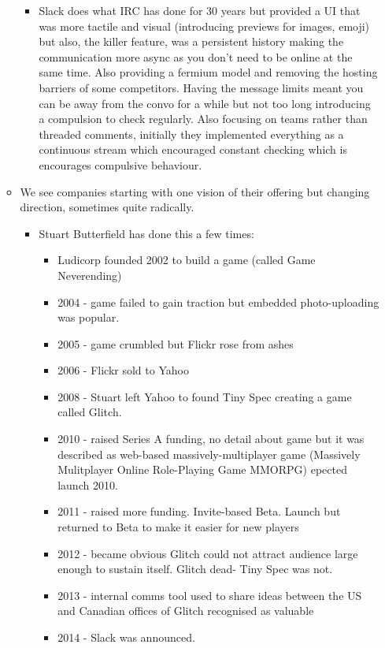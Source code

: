 \documentclass[11pt]{article}
\begin{document}
\begin{itemize}
\begin{itemize}
\begin{itemize}
\item Slack does what IRC has done for 30 years but provided a UI that was more tactile and visual (introducing previews for images, emoji) but also, the killer feature, was a persistent history
making the communication more async as you don't need to be online at the same time. Also providing a fermium model and removing the hosting barriers of some competitors. Having the message
limits meant you can be away from the convo for a while but not too long introducing a compulsion to check regularly. Also focusing on teams rather than threaded comments, initially they
implemented everything as a continuous stream which encouraged constant checking which is encourages compulsive behaviour.
\end{itemize}
\item We see companies starting with one vision of their offering but changing direction, sometimes quite radically.
\begin{itemize}
\item Stuart Butterfield has done this a few times:
\begin{itemize}
\item Ludicorp founded 2002 to build a game (called Game Neverending)
\item 2004 - game failed to gain traction but embedded photo-uploading was popular.
\item 2005 - game crumbled but Flickr rose from ashes
\item 2006 - Flickr sold to Yahoo
\item 2008 - Stuart left Yahoo to found Tiny Spec creating a game called Glitch.
\item 2010 - raised Series A funding, no detail about game but it was described as web-based massively-multiplayer game (Massively Mulitplayer Online Role-Playing Game MMORPG) epected launch 2010.
\item 2011 - raised more funding. Invite-based Beta. Launch but returned to Beta to make it easier for new players
\item 2012 - became obvious Glitch could not attract audience large enough to sustain itself. Glitch dead- Tiny Spec was not.
\item 2013 - internal comms tool used to share ideas between the US and Canadian offices of Glitch recognised as valuable
\item 2014 - Slack was announced.
\end{itemize}
\end{itemize}
\end{itemize}

\end{itemize}
\end{document}
